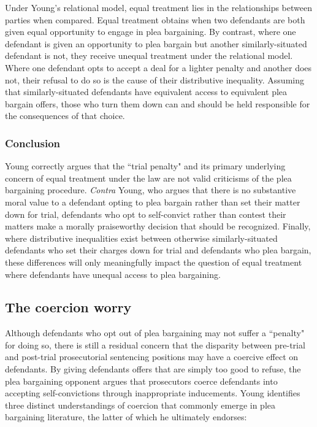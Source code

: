 Under Young's relational model, equal treatment lies in the relationships between parties when compared. Equal treatment obtains when two defendants are both given equal opportunity to engage in plea bargaining. By contrast, where one defendant is given an opportunity to plea bargain but another similarly-situated defendant is not, they receive unequal treatment under the relational model. Where one defendant opts to accept a deal for a lighter penalty and another does not, their refusal to do so is the cause of their distributive inequality. Assuming that similarly-situated defendants have equivalent access to equivalent plea bargain offers, those who turn them down can and should be held responsible for the consequences of that choice.

\subsubsection{Conclusion}

Young correctly argues that the ``trial penalty" and its primary underlying concern of equal treatment under the law are not valid criticisms of the plea bargaining procedure. \textit{Contra} Young, who argues that there is no substantive moral value to a defendant opting to plea bargain rather than set their matter down for trial, defendants who opt to self-convict rather than contest their matters make a morally praiseworthy decision that should be recognized. Finally, where distributive inequalities exist between otherwise similarly-situated defendants who set their charges down for trial and defendants who plea bargain, these differences will only meaningfully impact the question of equal treatment where defendants have unequal access to plea bargaining. 

\subsection{The coercion worry}

Although defendants who opt out of plea bargaining may not suffer a ``penalty" for doing so, there is still a residual concern that the disparity between pre-trial and post-trial prosecutorial sentencing positions may have a coercive effect on defendants. By giving defendants offers that are simply too good to refuse, the plea bargaining opponent argues that prosecutors coerce defendants into accepting self-convictions through inappropriate inducements. Young identifies three distinct understandings of coercion that commonly emerge in plea bargaining literature, the latter of which he ultimately endorses:

